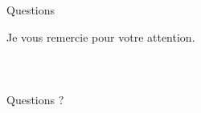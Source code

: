 \documentclass[french]{beamer}
\begin{document}
\begin{frame}{Questions}
\begin{center}
{\LARGE Je vous remercie pour votre attention.}\\
\\
\\

\\
{\Large Questions ?}
\end{center}
\end{frame}
\end{document}
